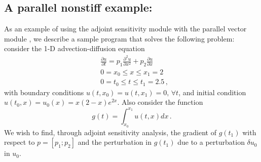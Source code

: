 
\newpage
\subsection{A parallel nonstiff example: }
\label{ss:cvsadjnonx_p}

As an example of using the {\cvodes} adjoint sensitivity module with
the parallel vector module {\nvecp}, we describe a sample program
that solves the following problem: consider the 1-D advection-diffusion
equation
\begin{equation}\label{e:cvsadjnonx_p:orig_pde}
  \begin{split}
    & \frac{\partial u}{\partial t} = p_1 \frac{\partial^2 u}{\partial x^2} 
    + p_2 \frac{\partial u}{\partial x} \\
    & 0 = x_0 \le x \le x_1 = 2 \\
    & 0 = t_0 \le t \le t_1 = 2.5 \, ,
  \end{split}
\end{equation}
with boundary conditions $u(t,x_0) = u(t,x_1) = 0 ,\, \forall t$,
and initial condition $u(t_0 , x) = u_0(x) = x(2-x)e^{2x}$. Also
consider the function
\begin{equation*}
  g(t) = \int_{x_0}^{x_1} u(t,x) dx \, .
\end{equation*}
We wish to find, through adjoint sensitivity analysis, the gradient of
$g(t_1)$ with respect to $p = [p_1 ; p_2]$ and the perturbation in $g(t_1)$
due to a perturbation $\delta u_0$ in $u_0$.

